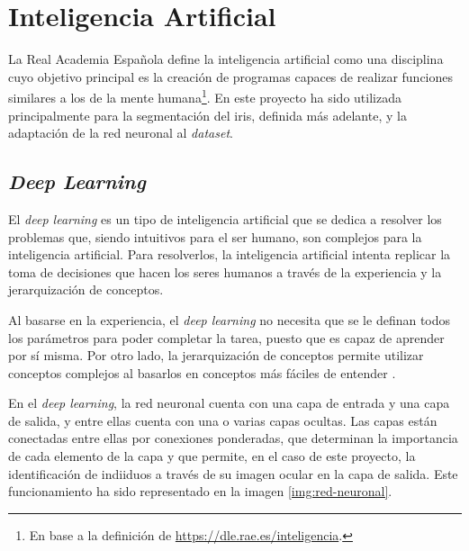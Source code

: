 \section{Inteligencia Artificial}

La Real Academia Española define la inteligencia artificial como una disciplina cuyo objetivo principal es la creación de programas capaces de realizar funciones similares a los de la mente humana\footnote{En base a la definición de \url{https://dle.rae.es/inteligencia}.}. 
En este proyecto ha sido utilizada principalmente para la segmentación del iris, definida más adelante, y la adaptación de la red neuronal al \textit{dataset}.

\subsection{\textit{Deep Learning}}

El \textit{deep learning} es un tipo de inteligencia artificial que se dedica a resolver los problemas que, siendo intuitivos para el ser humano, son complejos para la inteligencia artificial. Para resolverlos, la inteligencia artificial intenta replicar la toma de decisiones que hacen los seres humanos a través de la experiencia y la jerarquización de conceptos. 

Al basarse en la experiencia, el \textit{deep learning} no necesita que se le definan todos los parámetros para poder completar la tarea, puesto que es capaz de aprender por sí misma. Por otro lado, la jerarquización de conceptos permite utilizar conceptos complejos 
al basarlos en conceptos más fáciles de entender \cite{Goodfellow-et-al-2016}.

En el \textit{deep learning}, la red neuronal cuenta con una capa de entrada y una capa de salida, y entre ellas cuenta con una o varias capas ocultas. 
Las capas están conectadas entre ellas por conexiones ponderadas, que determinan la importancia de cada elemento de la capa y que permite, en el caso de este proyecto, la identificación de indiiduos a través de su imagen ocular en la capa de salida. Este funcionamiento ha sido representado en la imagen \ref{img:red-neuronal}.


